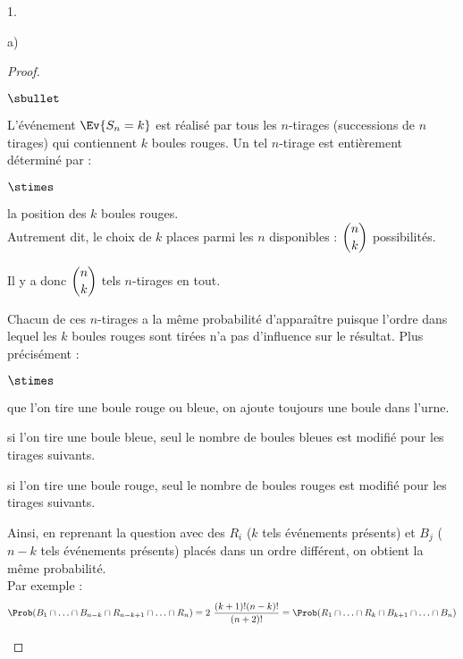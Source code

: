 \begin{noliste}{1.}
\begin{noliste}{a)}
    \begin{proof}~
      \begin{noliste}{$\sbullet$}
      \item L'événement $\Ev{S_n = k}$ est réalisé par tous les
        $n$-tirages (successions de $n$ tirages) qui contiennent $k$
        boules rouges. Un tel $n$-tirage est entièrement déterminé par :
        \begin{noliste}{$\stimes$}
        \item la position des $k$ boules rouges.\\
          Autrement dit, le choix de $k$ places parmi les $n$
          disponibles : $\dbinom{n}{k}$ possibilités.
        \end{noliste}
        Il y a donc $\dbinom{n}{k}$ tels $n$-tirages en tout.
      \item Chacun de ces $n$-tirages a la même probabilité
        d'apparaître puisque l'ordre dans lequel les $k$ boules rouges
        sont tirées n'a pas d'influence sur le résultat. Plus
        précisément :
        \begin{noliste}{$\stimes$}
        \item que l'on tire une boule rouge ou bleue, on ajoute
          toujours une boule dans l'urne.
        \item si l'on tire une boule bleue, seul le nombre de boules
          bleues est modifié pour les tirages suivants.
        \item si l'on tire une boule rouge, seul le nombre de boules
          rouges est modifié pour les tirages suivants.
        \end{noliste}
        Ainsi, en reprenant la question  avec des $R_i$
        ($k$ tels événements présents) et $B_j$ ($n-k$ tels événements
        présents) placés dans un ordre différent, on obtient la même
        probabilité.\\
        Par exemple :
        \[
        \Prob(B_1 \cap \ldots \cap B_{n-k} \cap R_{n-k+1} \cap \ldots
        \cap R_n) = 2 \ \dfrac{(k+1)! (n-k)!}{(n+2)!} = \Prob(R_1 \cap
        \ldots \cap R_{k} \cap B_{k+1} \cap \ldots \cap B_n)
        \]


\end{noliste}
\end{proof}
\end{noliste}
\end{noliste}
